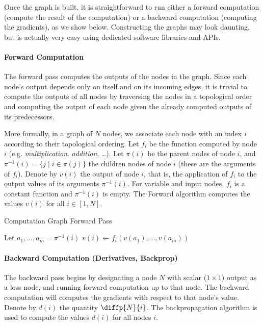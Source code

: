 \documentclass[jair,twoside,11pt,theapa]{article}
\begin{document}
{Once the graph is built, it is straightforward to run either a forward
computation (compute the result of the computation) or a backward computation
(computing the gradients), as we show below. Constructing the graphs may look
daunting, but is actually very easy using dedicated software libraries and APIs.

\paragraph{Forward Computation} The forward pass computes the outputs of the
nodes in the graph. Since each node's output depends only on itself and on its
incoming edges, it is trivial to compute the outputs of all nodes by traversing
the nodes in a topological order and computing the output of each node given the
already computed outputs of its predecessors.

More formally, in a graph of $N$ nodes, we associate each node with an index $i$ according to their topological
ordering. Let $f_i$ be the function computed by node $i$ (e.g.
\emph{multiplication}. \emph{addition}, \dots). Let $\pi(i)$ be the
parent nodes of node $i$, and $\pi^{-1}(i) = \{j\mid i\in\pi(j)\}$ the children nodes
of node $i$ (these are the arguments of $f_i$).
Denote by $v(i)$ the output of node $i$, that is, the application of $f_i$ to
the output values of its arguments $\pi^{-1}(i)$.    For variable and input nodes,
$f_i$ is a constant function and $\pi^{-1}(i)$ is empty. 
The Forward algorithm computes the values $v(i)$ for all $i \in [1, N]$.
\begin{algorithm}[h]
    \caption{Computation Graph Forward Pass}
    \label{alg:forward}
\begin{algorithmic}[1]
    \State Let $a_1,\ldots,a_m = \pi^{-1}(i)$
    \State $v(i) \gets f_i(v(a_1),\ldots,v(a_m))$
    \EndFor
\end{algorithmic}
\end{algorithm}

\paragraph{Backward Computation (Derivatives, Backprop)} 
The backward pass begins by designating a node $N$ with scalar ($1 \times 1$) output as a loss-node, and running forward computation up to that node.
The backward computation will computes the gradients with respect to that node's value. 
Denote by $d(i)$ the quantity $\diffp{N}{i}$.  The backpropagation algorithm is
used to compute the values $d(i)$ for all nodes $i$.

}
\end{document}

